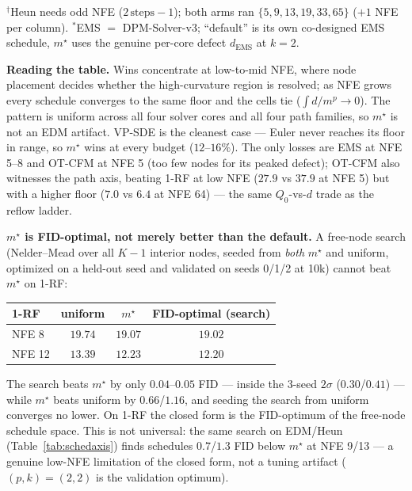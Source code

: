 \documentclass[11pt]{article}
\begin{document}
\begin{table}[t]
\smallskip
{\footnotesize $^\dagger$Heun needs odd NFE ($2\,\mathrm{steps}{-}1$); both
arms ran $\{5,9,13,19,33,65\}$ ($+1$ NFE per column). $^\ast$EMS $=$
DPM-Solver-v3; ``default'' is its own co-designed EMS schedule, $m^\star$ uses
the genuine per-core defect $d_{\mathrm{EMS}}$ at $k\!=\!2$.}
\end{table}

\noindent\textbf{Reading the table.} Wins concentrate at low-to-mid NFE,
where node placement decides whether the high-curvature region is resolved;
as NFE grows every schedule converges to the same floor and the cells tie
($\int d/m^{p}\!\to\!0$). The pattern is uniform across all four solver cores
and all four path families, so $m^\star$ is not an EDM artifact. VP-SDE is the
cleanest case --- Euler never reaches its floor in range, so $m^\star$ wins at
every budget ($12$--$16\%$). The only losses are EMS at NFE 5--8 and OT-CFM at
NFE 5 (too few nodes for its peaked defect); OT-CFM also witnesses the path
axis, beating 1-RF at low NFE ($27.9$ vs $37.9$ at NFE 5) but with a higher
floor ($7.0$ vs $6.4$ at NFE 64) --- the same $Q_0$-vs-$d$ trade as the reflow
ladder.

\medskip
\noindent\textbf{$m^\star$ is FID-optimal, not merely better than the
default.} A free-node search (Nelder--Mead over all $K\!-\!1$ interior nodes,
seeded from \emph{both} $m^\star$ and uniform, optimized on a held-out seed
and validated on seeds 0/1/2 at 10k) cannot beat $m^\star$ on 1-RF:

\begin{center}\small
\begin{tabular}{lccc}
\toprule
1-RF & uniform & $m^\star$ & FID-optimal (search)\\
\midrule
NFE 8  & $19.74$ & $\mathbf{19.07}$ & $19.02$\\
NFE 12 & $13.39$ & $\mathbf{12.23}$ & $12.20$\\
\bottomrule
\end{tabular}
\end{center}

\noindent The search beats $m^\star$ by only $0.04$--$0.05$ FID --- inside the
3-seed $2\sigma$ ($0.30$/$0.41$) --- while $m^\star$ beats uniform by
$0.66$/$1.16$, and seeding the search from uniform converges no lower. On 1-RF
the closed form is the FID-optimum of the free-node schedule space. This is
not universal: the same search on EDM/Heun (Table~\ref{tab:schedaxis}) finds
schedules $0.7$/$1.3$ FID below $m^\star$ at NFE 9/13 --- a genuine low-NFE
limitation of the closed form, not a tuning artifact ($(p,k)\!=\!(2,2)$ is the
validation optimum).
\end{document}
